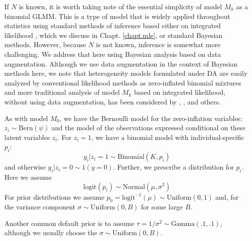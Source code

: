 If $N$ is known, it is worth taking note of the essential simplicity
of model $M_h$ as a binomial GLMM.  This is a type of model that is
widely applied throughout statistics using
standard methods of inference based either on integrated likelihood
\citep{laird_ware:1982, berger_etal:1999}, which we discuss in
Chapt. \ref{chapt.mle}, or standard Bayesian
methods. However, because $N$ is not known, inference is somewhat more
challenging. We address that here using Bayesian analysis based on
data augmentation. Although we use data augmentation in the context of
Bayesian methods here, we note that
heterogeneity models formulated under DA are easily analyzed by
conventional likelihood methods as zero-inflated binomial mixtures
\citep{royle:2006} and more traditional analysis of model $M_h$ based on
integrated likelihood, without using data augmentation, has been
considered by \citet{coull_agresti:1999}, \citet{dorazio_royle:2003},
and others.

As with model $M_{0}$, we have the Bernoulli model for the
zero-inflation variables: $z_{i} \sim \mbox{Bern}(\psi)$ and the model
of the observations expressed conditional on these latent variables
$z_{i}$. For $z_{i}=1$, we have a binomial model with
individual-specific $p_{i}$:
\[
y_{i}|{z_{i} \! = \! 1} \sim \mbox{Binomial}(K,p_{i})
\]
and otherwise $y_{i} |{ z_{i} \! = \! 0} \sim 1(y=0)$. Further, we
prescribe a distribution for $p_{i}$. Here we assume
\[
\mathrm{logit}(p_{i}) \sim \mbox{Normal}(\mu,\sigma^2)
\]
For prior distributions we assume
$p_{0} = \mbox{logit}^{-1}(\mu) \sim
\mbox{Uniform}(0,1)$ and, for the variance component
$\sigma \sim \mbox{Uniform}(0,B)$ for some large $B$.

Another common default prior is to assume
$\tau = 1/\sigma^{2} \sim \mbox{Gamma}(.1,.1)$, although we usually
choose the $\sigma \sim \mbox{Uniform}(0,B)$.



